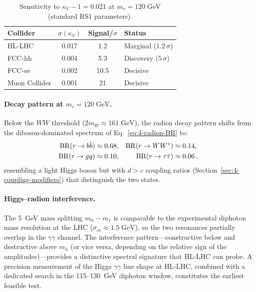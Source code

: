 \begin{table}[htbp]
\centering
\caption{Sensitivity to $\kappa_V - 1 = 0.021$ at $m_r = 120\;\mathrm{GeV}$ (standard RS1 parameters).}
\label{tab:4-collider-120}
\small
\begin{tabular}{@{}lccl@{}}
\toprule
Collider & $\sigma(\kappa_V)$ & Signal/$\sigma$ & Status \\
\midrule
HL-LHC & 0.017 & 1.2 & Marginal ($1.2\,\sigma$) \\
FCC-hh & 0.004 & 5.3 & Discovery ($5\,\sigma$) \\
FCC-ee & 0.002 & 10.5 & Decisive \\
Muon Collider & 0.001 & 21 & Decisive \\
\bottomrule
\end{tabular}
\end{table}

\paragraph{Decay pattern at $m_r = 120\;\mathrm{GeV}$.}  Below the $WW$ threshold ($2m_W \approx 161\;\mathrm{GeV}$), the radion decay pattern shifts from the diboson-dominated spectrum of Eq.~\eqref{eq:4-radion-BR} to:
\begin{align}
  \mathrm{BR}(r \to b\bar{b}) &\approx 0.68, &
  \mathrm{BR}(r \to WW^*) &\approx 0.14, \notag\\
  \mathrm{BR}(r \to gg) &\approx 0.10, &
  \mathrm{BR}(r \to \tau\bar\tau) &\approx 0.06\,,
  \label{eq:4-radion-BR-120}
\end{align}
resembling a light Higgs boson but with $d > c$ coupling ratios (Section~\ref{sec:4-coupling-modifiers}) that distinguish the two states.

\paragraph{Higgs--radion interference.}  The 5~GeV mass splitting $m_h - m_r$ is comparable to the experimental diphoton mass resolution at the LHC ($\sigma_m \approx 1.5\;\mathrm{GeV}$), so the two resonances partially overlap in the $\gamma\gamma$ channel.  The interference pattern---constructive below and destructive above $m_h$ (or vice versa, depending on the relative sign of the amplitudes)---provides a distinctive spectral signature that HL-LHC can probe.  A precision measurement of the Higgs $\gamma\gamma$ line shape at HL-LHC, combined with a dedicated search in the 115--130~GeV diphoton window, constitutes the earliest feasible test.

